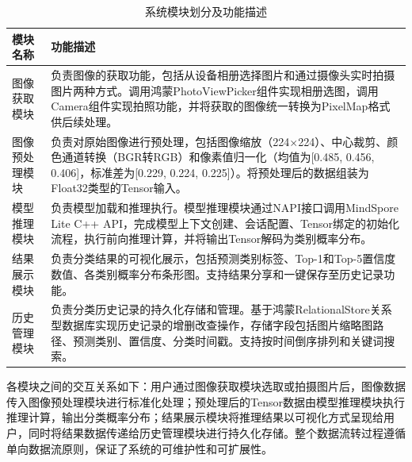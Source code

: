 \begin{table}[htbp]
	\centering
	\caption{系统模块划分及功能描述}
	\label{tab:modules}
	\begin{tabular}{p{3cm}p{9cm}}
		\toprule
		模块名称 & 功能描述 \\
		\midrule
		图像获取模块 & 负责图像的获取功能，包括从设备相册选择图片和通过摄像头实时拍摄图片两种方式。调用鸿蒙PhotoViewPicker组件实现相册选图，调用Camera组件实现拍照功能，并将获取的图像统一转换为PixelMap格式供后续处理。 \\
		\addlinespace
		图像预处理模块 & 负责对原始图像进行预处理，包括图像缩放（224$\times$224）、中心裁剪、颜色通道转换（BGR转RGB）和像素值归一化（均值为[0.485, 0.456, 0.406]，标准差为[0.229, 0.224, 0.225]）。将预处理后的数据组装为Float32类型的Tensor输入。 \\
		\addlinespace
		模型推理模块 & 负责模型加载和推理执行。模型推理模块通过NAPI接口调用MindSpore Lite C++ API，完成模型上下文创建、会话配置、Tensor绑定的初始化流程，执行前向推理计算，并将输出Tensor解码为类别概率分布。 \\
		\addlinespace
		结果展示模块 & 负责分类结果的可视化展示，包括预测类别标签、Top-1和Top-5置信度数值、各类别概率分布条形图。支持结果分享和一键保存至历史记录功能。 \\
		\addlinespace
		历史管理模块 & 负责分类历史记录的持久化存储和管理。基于鸿蒙RelationalStore关系型数据库实现历史记录的增删改查操作，存储字段包括图片缩略图路径、预测类别、置信度、分类时间戳。支持按时间倒序排列和关键词搜索。 \\
		\bottomrule
	\end{tabular}
\end{table}

各模块之间的交互关系如下：用户通过图像获取模块选取或拍摄图片后，图像数据传入图像预处理模块进行标准化处理；预处理后的Tensor数据由模型推理模块执行推理计算，输出分类概率分布；结果展示模块将推理结果以可视化方式呈现给用户，同时将结果数据传递给历史管理模块进行持久化存储。整个数据流转过程遵循单向数据流原则，保证了系统的可维护性和可扩展性。